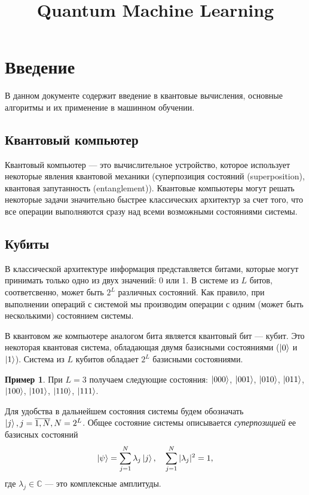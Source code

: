 \documentclass{article}
\title{Quantum Machine Learning}
\date{}
\theoremstyle{definition}
\newtheorem{example}{Пример}
\begin{document}
\maketitle

\section{Введение}
В данном документе содержит введение в квантовые вычисления, основные алгоритмы и их применение в машинном обучении.


\subsection{Квантовый компьютер}

Квантовый компьютер --- это вычислительное устройство, которое использует некоторые явления квантовой механики
(суперпозиция состояний (superposition), квантовая запутанность (entanglement)).
Квантовые компьютеры могут решать некоторые задачи значительно быстрее классических архитектур за счет того,
что все операции выполняются сразу над всеми возможными состояниями системы.

\subsection{Кубиты}
В классической архитектуре информация представляется битами, которые могут принимать только одно из двух значений:
$0$ или $1$.
В системе из $L$ битов, соответсвенно, может быть $2^L$ различных состояний.
Как правило, при выполнении операций с системой мы производим операции с одним (может быть несколькими) состоянием системы.

В квантовом же компьютере аналогом бита является квантовый бит --- кубит.
Это некоторая квантовая система, обладающая двумя базисными состояниями ($\ket{0}$ и $\ket{1}$).
Система из $L$ кубитов обладает $2^L$ базисными состояниями.

\begin{example}
При $L = 3$ получаем следующие состояния:
$\ket{000}$, $\ket{001}$, $\ket{010}$, $\ket{011}$, $\ket{100}$, $\ket{101}$, $\ket{110}$, $\ket{111}$.
\end{example}

Для удобства в дальнейшем состояния системы будем обозначать $\ket{j}, j=\overline{1, N}, N = 2^L$.
Общее состояние системы описывается {\em суперпозицией} ее базисных состояний
\[
    \ket{\psi} = \sum_{j=1}^{N} \lambda_j \ket{j}, \quad \sum_{j=1}^N |\lambda_j|^2 = 1,
\]
где $\lambda_j \in \mathbb{C}$ --- это комплексные амплитуды.
\end{document}
